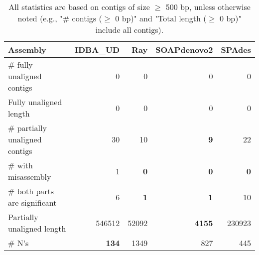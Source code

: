 \documentclass[12pt,a4paper]{article}
\begin{document}
\begin{table}[ht]
\begin{center}
\caption{All statistics are based on contigs of size $\geq$ 500 bp, unless otherwise noted (e.g., "\# contigs ($\geq$ 0 bp)" and "Total length ($\geq$ 0 bp)" include all contigs).}
\begin{tabular}{|l*{4}{|r}|}
\hline
Assembly & IDBA\_UD & Ray & SOAPdenovo2 & SPAdes \\ \hline
\# fully unaligned contigs & 0 & 0 & 0 & 0 \\ \hline
Fully unaligned length & 0 & 0 & 0 & 0 \\ \hline
\# partially unaligned contigs & 30 & 10 & {\bf 9} & 22 \\ \hline
\hspace{5mm}\# with misassembly & 1 & {\bf 0} & {\bf 0} & {\bf 0} \\ \hline
\hspace{5mm}\# both parts are significant & 6 & {\bf 1} & {\bf 1} & 10 \\ \hline
Partially unaligned length & 546512 & 52092 & {\bf 4155} & 230923 \\ \hline
\# N's & {\bf 134} & 1349 & 827 & 445 \\ \hline
\end{tabular}
\end{center}
\end{table}
\end{document}
